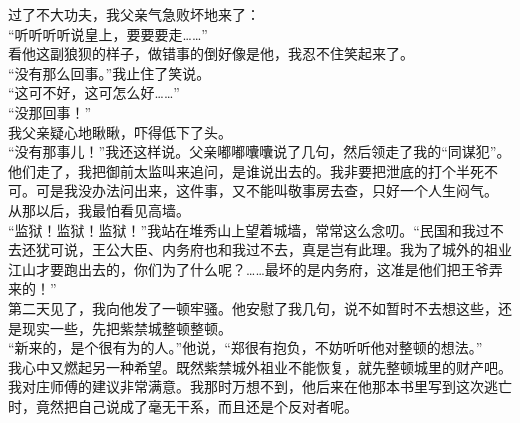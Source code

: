 过了不大功夫，我父亲气急败坏地来了：\\

“听听听听说皇上，要要要走……”\\

看他这副狼狈的样子，做错事的倒好像是他，我忍不住笑起来了。\\

“没有那么回事。”我止住了笑说。\\

“这可不好，这可怎么好……”\\

“没那回事！”\\

我父亲疑心地瞅瞅，吓得低下了头。\\

“没有那事儿！”我还这样说。父亲嘟嘟囔囔说了几句，然后领走了我的“同谋犯”。他们走了，我把御前太监叫来追问，是谁说出去的。我非要把泄底的打个半死不可。可是我没办法问出来，这件事，又不能叫敬事房去查，只好一个人生闷气。\\

从那以后，我最怕看见高墙。\\

“监狱！监狱！监狱！”我站在堆秀山上望着城墙，常常这么念叨。“民国和我过不去还犹可说，王公大臣、内务府也和我过不去，真是岂有此理。我为了城外的祖业江山才要跑出去的，你们为了什么呢？……最坏的是内务府，这准是他们把王爷弄来的！”\\

第二天见了，我向他发了一顿牢骚。他安慰了我几句，说不如暂时不去想这些，还是现实一些，先把紫禁城整顿整顿。\\

“新来的，是个很有为的人。”他说，“郑很有抱负，不妨听听他对整顿的想法。”\\

我心中又燃起另一种希望。既然紫禁城外祖业不能恢复，就先整顿城里的财产吧。我对庄师傅的建议非常满意。我那时万想不到，他后来在他那本书里写到这次逃亡时，竟然把自己说成了毫无干系，而且还是个反对者呢。
